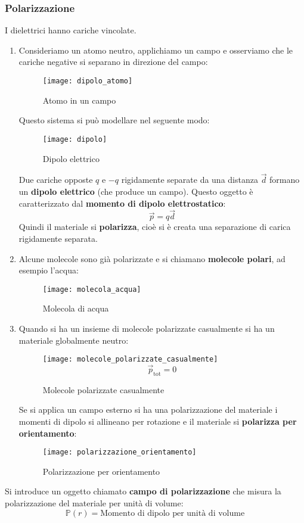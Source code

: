 \documentclass[a4paper]{article}
\begin{document}
\subsubsection{Polarizzazione}
I dielettrici hanno cariche vincolate.

\begin{enumerate}
  \item 
    Consideriamo un atomo neutro,
    applichiamo un campo e osserviamo che le cariche negative si separano in direzione
    del campo:
    \begin{figure}[H]
      \centering
      \texttt{[image: dipolo\_atomo]}
      \caption{Atomo in un campo}
    \end{figure}
    \noindent
    Questo sistema si può modellare nel seguente modo:
    \begin{figure}[H]
      \centering
      \texttt{[image: dipolo]}
      \caption{Dipolo elettrico}
    \end{figure}
    \noindent
    Due cariche opposte \( q \) e \( -q \) rigidamente separate da una distanza \( \vec{d} \)
    formano un \textbf{dipolo elettrico} (che produce un campo). Questo oggetto è caratterizzato dal
    \textbf{momento di dipolo elettrostatico}:
    \[
      \vec{p} = q \vec{d}
    \] 
    Quindi il materiale si \textbf{polarizza}, cioè si è creata una separazione di carica
    rigidamente separata.

  \item 
    Alcune molecole sono già polarizzate e si chiamano \textbf{molecole polari}, ad esempio
    l'acqua:
    \begin{figure}[H]
      \centering
      \texttt{[image: molecola\_acqua]}
      \caption{Molecola di acqua}
    \end{figure}

  \item 
    Quando si ha un insieme di molecole polarizzate casualmente si ha un materiale
    globalmente neutro:
    \begin{figure}[H]
      \centering
      \texttt{[image: molecole\_polarizzate\_casualmente]}
      \[
        \vec{p}_{\text{tot}} = 0
      \] 
      \caption{Molecole polarizzate casualmente}
    \end{figure}
    \noindent
    Se si applica un campo esterno si ha una polarizzazione del materiale i momenti
    di dipolo si allineano per rotazione e il materiale si \textbf{polarizza per
    orientamento}:
    \begin{figure}[H]
      \centering
      \texttt{[image: polarizzazione\_orientamento]}
      \caption{Polarizzazione per orientamento}
    \end{figure}
\end{enumerate}
\vspace{1em}
\noindent
Si introduce un oggetto chiamato \textbf{campo di polarizzazione} che misura
la polarizzazione del materiale per unità di volume:
\[
  \mathbb{P}(r) = \text{Momento di dipolo per unità di volume}
\] 
\end{document}
